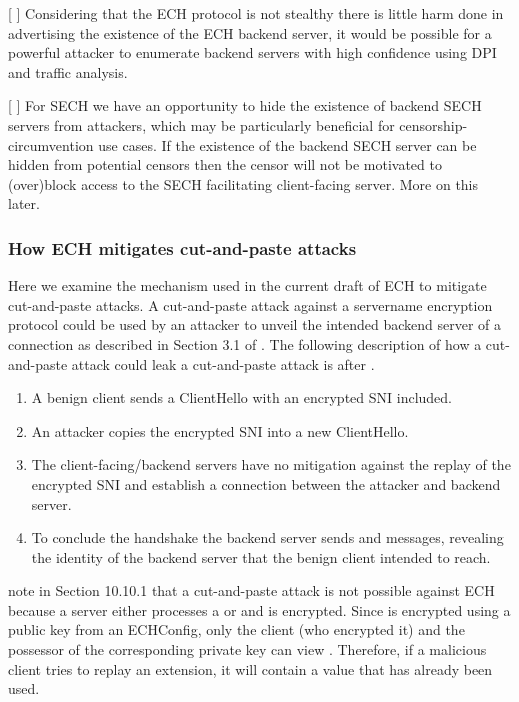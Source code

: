 [ ] Considering that the ECH protocol is not stealthy there is little harm done in advertising the existence of the ECH backend server, it would be possible for a powerful attacker to enumerate backend servers with high confidence using DPI and traffic analysis.

[ ] For SECH we have an opportunity to hide the existence of backend SECH servers from attackers, which may be particularly beneficial for censorship-circumvention use cases. If the existence of the backend SECH server can be hidden from potential censors then the censor will not be motivated to (over)block access to the SECH facilitating client-facing server. More on this later.

\subsubsection{How ECH mitigates cut-and-paste attacks}
Here we examine the mechanism used in the current draft of ECH to mitigate cut-and-paste attacks. A cut-and-paste attack against a servername encryption protocol could be used by an attacker to unveil the intended backend server of a connection as described in Section 3.1 of \cite{rfc8744-issues}. The following description of how a cut-and-paste attack could leak a cut-and-paste attack is after \cite{rfc8744-issues}.
\begin{enumerate}
    \item A benign client sends a ClientHello with an encrypted SNI included.
    \item An attacker copies the encrypted SNI into a new ClientHello.
    \item The client-facing/backend servers have no mitigation against the replay of the encrypted SNI and establish a connection between the attacker and backend server.
    \item To conclude the handshake the backend server sends  and  messages, revealing the identity of the backend server that the benign client intended to reach. 
\end{enumerate}
\cite{esni} note in Section 10.10.1 that a cut-and-paste attack is not possible against ECH because a server either processes a  or  and  is encrypted. Since  is encrypted using a public key from an ECHConfig, only the client (who encrypted it) and the possessor of the corresponding private key can view . Therefore, if a malicious client tries to replay an  extension, it will contain a  value that has already been used.

